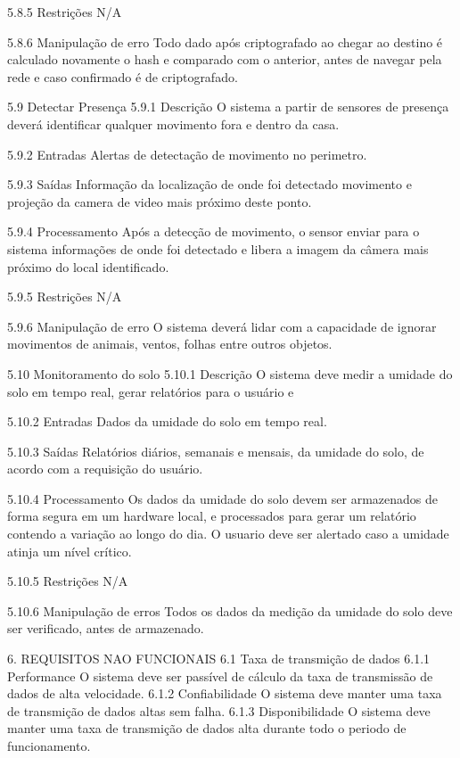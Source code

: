 5.8.5 Restrições
N/A

5.8.6 Manipulação de erro
    Todo dado após criptografado ao chegar ao destino é calculado novamente o hash e comparado com o anterior, antes de navegar pela rede e caso confirmado é de criptografado.


5.9 Detectar Presença
5.9.1 Descrição
 O sistema a partir de sensores de presença deverá identificar qualquer movimento fora e dentro da casa.

5.9.2 Entradas
    Alertas de detectação de movimento no perimetro.

5.9.3 Saídas
    Informação da localização de onde foi detectado movimento e projeção da camera de video mais próximo deste ponto.

5.9.4 Processamento
    Após a detecção de movimento, o sensor enviar para o sistema informações de onde foi detectado e libera a imagem da câmera mais próximo do local identificado.

5.9.5 Restrições
N/A

5.9.6 Manipulação de erro
O sistema deverá lidar com a capacidade de ignorar movimentos de animais, ventos, folhas entre outros objetos.


5.10 Monitoramento do solo
5.10.1 Descrição
O sistema deve medir a umidade do solo em tempo real, gerar relatórios para o usuário e 

5.10.2 Entradas
Dados da umidade do solo em tempo real.

5.10.3 Saídas
Relatórios diários, semanais e mensais, da umidade do solo, de acordo com a requisição do usuário.

5.10.4 Processamento
Os dados da umidade do solo devem ser armazenados de forma segura em um hardware local, e processados para gerar um relatório contendo a variação ao longo do dia.
O usuario deve ser alertado caso a umidade atinja um nível crítico.

5.10.5 Restrições
N/A

5.10.6 Manipulação de erros
Todos os dados da medição da umidade do solo deve ser verificado, antes de armazenado.



















6. REQUISITOS NAO FUNCIONAIS
6.1 Taxa de transmição de dados
6.1.1 Performance 
O sistema deve ser passível de cálculo da taxa de transmissão de dados de alta velocidade.
6.1.2 Confiabilidade
    O sistema deve manter uma taxa de transmição de dados altas sem falha.
6.1.3 Disponibilidade
    O sistema deve manter uma taxa de transmição de dados alta durante todo o periodo de funcionamento.

